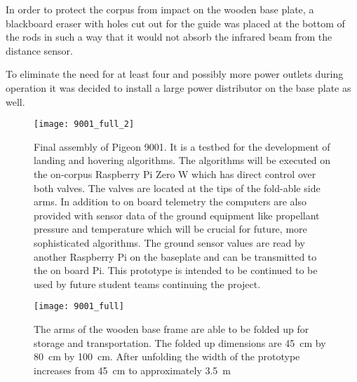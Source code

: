 In order to protect the corpus from impact on the wooden base plate, a blackboard eraser with holes cut out for the guide was placed at the bottom of the rods in such a way that it would not absorb the infrared beam from the distance sensor.

To eliminate the need for at least four and possibly more power outlets during operation it was decided to install a large power distributor on the base plate as well.

\begin{figure}[H]
\centering

\texttt{[image: 9001\_full\_2]}

\caption{Final assembly of Pigeon 9001. It is a testbed for the development of landing and hovering algorithms. The algorithms will be executed on the on-corpus Raspberry Pi Zero W which has direct control over both valves. The valves are located at the tips of the fold-able side arms. In addition to on board telemetry the computers are also provided with sensor data of the ground equipment like propellant pressure and temperature which will be crucial for future, more sophisticated algorithms. The ground sensor values are read by another Raspberry Pi on the baseplate and can be transmitted to the on board Pi. This prototype is intended to be continued to be used by future student teams continuing the project.}
\end{figure}

\begin{figure}[H]
\centering

\texttt{[image: 9001\_full]}

\caption{The arms of the wooden base frame are able to be folded up for storage and transportation. The folded up dimensions are \SI{45}{\centi\meter} by \SI{80}{\centi\meter} by \SI{100}{\centi\meter}. After unfolding the width of the prototype increases from \SI{45}{\centi\meter} to approximately \SI{3.5}{\meter}}
\end{figure}
